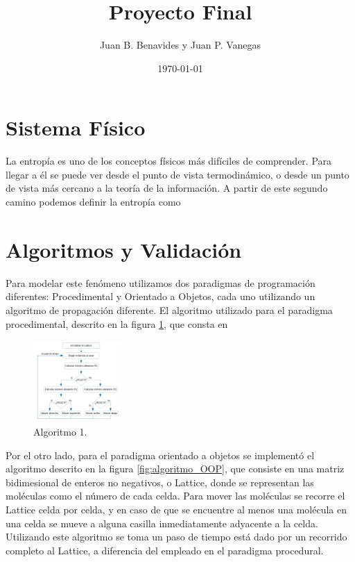 \documentclass[12pt,twocolumn]{article}
\title{Proyecto Final}
\author{Juan B. Benavides y Juan P. Vanegas }
\date{\today}
\begin{document}
\maketitle

\section{\label{sec: Intro} Sistema Físico}
La entropía es uno de los conceptos físicos más difíciles de comprender. Para llegar a 
él se puede ver desde el punto de vista termodinámico, o desde un punto de vista más 
cercano a la teoría de la información. A partir de este segundo camino podemos definir la 
entropía como 

\section{Algoritmos y Validación}

Para modelar este fenómeno utilizamos dos paradigmas de programación diferentes: Procedimental 
y Orientado a Objetos, cada uno utilizando un algoritmo de propagación diferente. El 
algoritmo utilizado para el paradigma procedimental, descrito en la figura 
\ref{fig:algoritmo_Proc}, que consta en 

\begin{figure}
    \centering
    \includegraphics[width=0.3\textwidth]{figs/Algoritmo_Proc.png}
    \caption{Algoritmo 1.}
    \label{fig:algoritmo_Proc}
\end{figure}

Por el otro lado, para el paradigma orientado a objetos se implementó el algoritmo descrito 
en la figura \ref{fig:algoritmo_OOP}, que consiste en una matriz bidimesional de enteros no 
negativos, o Lattice, donde se representan las moléculas como el número de cada celda. Para 
mover las moléculas se recorre el Lattice celda por celda, y en caso de que se encuentre al 
menos una molécula en una celda se mueve a alguna casilla inmediatamente adyacente a la celda. 
Utilizando este algoritmo se toma un paso de tiempo está dado por un recorrido completo al 
Lattice, a diferencia del empleado en el paradigma procedural. 
\\ \\
\end{document}
